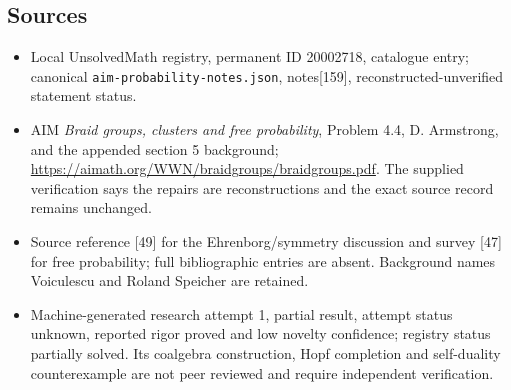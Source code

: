 \documentclass[11pt]{article}
\begin{document}
\subsection{Sources}
\begin{itemize}
\item Local UnsolvedMath registry, permanent ID 20002718, catalogue entry; canonical \texttt{aim-probability-notes.json}, notes[159], reconstructed-unverified statement status.
\item AIM \emph{Braid groups, clusters and free probability}, Problem 4.4, D. Armstrong, and the appended section 5 background; \url{https://aimath.org/WWN/braidgroups/braidgroups.pdf}. The supplied verification says the repairs are reconstructions and the exact source record remains unchanged.
\item Source reference [49] for the Ehrenborg/symmetry discussion and survey [47] for free probability; full bibliographic entries are absent. Background names Voiculescu and Roland Speicher are retained.
\item Machine-generated research attempt 1, partial result, attempt status unknown, reported rigor proved and low novelty confidence; registry status partially solved. Its coalgebra construction, Hopf completion and self-duality counterexample are not peer reviewed and require independent verification.
\end{itemize}
\end{document}
